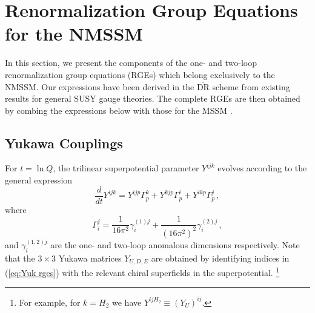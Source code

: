 \documentclass[final,3p,times,pdflatex]{elsarticle}
\newcommand{\dt}{\frac{d}{dt}}
\begin{document}
\section{Renormalization Group Equations for the NMSSM}\label{sec:RGEs}
In this section, we present the components of the one- and two-loop renormalization group equations (RGEs) which belong exclusively to the NMSSM.  Our expressions have been derived in the $\overline{\mbox{DR}}$ scheme from existing results \cite{MV94,Yam94} for general SUSY gauge theories. The complete RGEs are then obtained by combing the expressions below with those for the MSSM \cite{MV94}.

\subsection{Yukawa Couplings}
For $t = \ln Q$, the trilinear superpotential parameter $Y^{ijk}$ evolves 
according to the general expression \cite{MV94}
%
\begin{equation}
\dt Y^{ijk} = Y^{ijp}\Gamma_p^k + Y^{kjp}\Gamma_p^i + Y^{ikp}\Gamma_p^j\,,
\label{eq:Yuk rges}
\end{equation}
%
where 
%
\begin{equation}
\Gamma_i^j = \frac{1}{16\pi^2}\gamma_i^{(1)j} 
+ \frac{1}{(16\pi^2)^2}\gamma_{i}^{(2)j}\,, 
\end{equation}
%
and $\gamma^{(1,2)j}_i$ are the one- and two-loop anomalous dimensions 
respectively.  Note that the $3\times 3$ Yukawa matrices $Y_{U,D,E}$ are 
obtained by identifying indices in (\ref{eq:Yuk rges}) with the relevant chiral superfields in the superpotential.%
\footnote{For example, for $k=H_2$ we have $Y^{ijH_2}\equiv (Y_U)^{ij}$.}  
\end{document}
